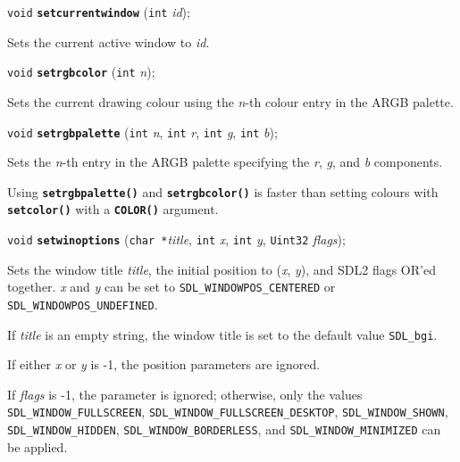 \documentclass[a4paper,12pt]{article}
\newcommand{\V}{\texttt{void}}      %
\newcommand{\I}{\texttt{int}}       %
\newcommand{\Ut}{\texttt{Uint32}}   %
\newcommand{\C}{\texttt{char *}}    %
\newcommand{\func}[1]{\textbf{\texttt{#1}}}  %
\newcommand{\A}[1]{\emph{#1}}       %
\newcommand{\T}[1]{\texttt{#1}}     %
\newenvironment{bgi}
{ %
  \begin{snugshade}
}
{ %
  \end{snugshade}
}
\begin{document}

\label{sec:setcurrentwindow}

\begin{bgi}
\V{} \func{setcurrentwindow} (\I{} \A{id});
\end{bgi}

Sets the current active window to \A{id}.


\label{sec:setrgbcolor}

\begin{bgi}
\V{} \func{setrgbcolor} (\I{} \A{n});
\end{bgi}

Sets the current drawing colour using the \A{n}-th colour entry in the
ARGB palette.


\label{sec:setrgbpalette}

\begin{bgi}
\V{} \func{setrgbpalette} (\I{} \A{n}, \I{} \A{r}, \I{} \A{g}, \I{} \A{b});
\end{bgi}

Sets the \A{n}-th entry in the ARGB palette specifying the \A{r},
\A{g}, and \A{b} components.

Using \func{setrgbpalette()} and \func{setrgbcolor()} is faster than
setting colours with \func{setco\-lor()} with a \func{COLOR()}
argument.


\label{sec:setwinoptions}

\begin{bgi}
\V{} \func{setwinoptions} (\C{}\A{title}, \I{} \A{x}, \I{} \A{y},
  \Ut{} \A{flags});
\end{bgi}

Sets the window title \A{title}, the initial position to (\A{x},
\A{y}), and SDL2 flags OR'ed together. \A{x} and \A{y} can be set to
\T{SDL\_WINDOWPOS\_CENTERED} or \T{SDL\_WINDOWPOS\_UNDEFI\-NED}.

If \A{title} is an empty string, the window title is set to the
default value \T{SDL\_bgi}.

If either \A{x} or \A{y} is -1, the position parameters are ignored.

If \A{flags} is -1, the parameter is ignored; otherwise, only the
values \T{SDL\_WINDOW\_FULL\-SCREEN},
\T{SDL\_WIN\-DOW\_FULLSCREEN\_DESKTOP}, \T{SDL\_WINDOW\_SHOWN},
\T{SDL\_WINDOW\_HIDDEN}, \T{SDL\_WINDOW\-\_BORDERLESS}, and
\T{SDL\_WINDOW\_MINIMIZED} can be applied.
\end{document}
